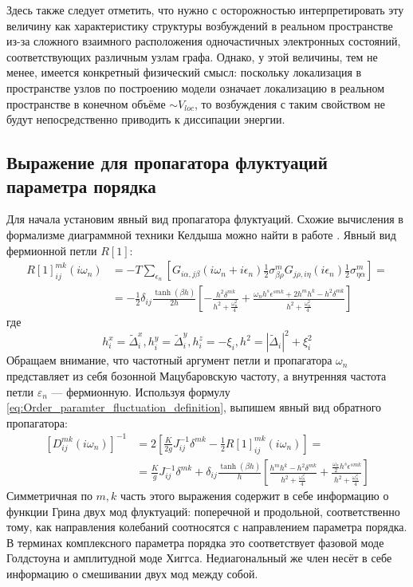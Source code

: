 Здесь также следует отметить, что нужно с осторожностью интерпретировать эту величину как характеристику структуры возбуждений в реальном пространстве из-за сложного взаимного расположения одночастичных электронных состояний, соответствующих различным узлам графа. Однако, у этой величины, тем не менее, имеется конкретный физический смысл: поскольку локализация в пространстве узлов по построению модели означает локализацию в реальном пространстве в конечном объёме $\sim V_{loc}$, то возбуждения с таким свойством не будут непосредственно приводить к диссипации энергии.


\subsection{Выражение для пропагатора флуктуаций параметра порядка}
Для начала установим явный вид пропагатора флуктуаций. Схожие вычисления в формализме диаграммной техники Келдыша можно найти в работе \cite{Poboiko_Feigelman_Paraconductivity}. 
Явный вид фермионной петли $R[1]$:
\begin{equation*}
	\begin{split}
		R[1]_{ij}^{mk}(i\omega_n) & = -T \sum_{\epsilon_n} \left[ G_{i\alpha,j\beta}(i\omega_n + i \epsilon_n) \frac{1}{2}\sigma^m_{\beta\rho} G_{j\rho,i\eta}(i \epsilon_n) \frac{1}{2} \sigma^m_{\eta\alpha} \right] = \\
		& = -\frac{1}{2} \delta_{ij} \frac{\tanh(\beta h)}{2 h} \left[ -\frac{ h^2 \delta^{mk} }{ h^2 + \frac{\omega_n^2}{4} } + \frac{ \omega_n h^s \epsilon^{smk} + 2 h^m h^k - h^2 \delta^{mk} }{h^2 + \frac{\omega_n^2}{4}} \right]
	\end{split}
\end{equation*}
где
$$
h^x_i = \widetilde{\Delta}^x_i, h^y_i = \widetilde{\Delta}^y_i, h^z_i = - \xi_i, h^2 = \left| \widetilde{\Delta}_i \right|^2 + \xi_i^2
$$
Обращаем внимание, что частотный аргумент петли и пропагатора $\omega_n$ представляет из себя бозонной Мацубаровскую частоту, а внутренняя частота петли $\varepsilon_n$ --- фермионную. Используя формулу \eqref{eq:Order_paramter_fluctuation_definition}, выпишем явный вид обратного пропагатора:
\begin{equation}
	\label{eq:Order_parameter_fluctuation_inverse_propagator_explicit}
	\begin{split}
		\left[ D^{mk}_{ij}(i \omega_n) \right]^{-1} & =  2\left[ \frac{K}{2g} J_{ij}^{-1} \delta^{mk} - \frac{1}{2} R[1]_{ij}^{mk}(i\omega_n) \right] = \\
		& = \frac{K}{g} J_{ij}^{-1} \delta^{mk} + \delta_{ij} \frac{\tanh(\beta h)}{h} \left[ \frac{ h^m h^k - h^2 \delta^{mk} }{h^2 + \frac{\omega_n^2}{4}} + \frac{ \frac{\omega_n}{2} h^s \epsilon^{smk} }{h^2 + \frac{\omega_n^2}{4}} \right]
	\end{split}
\end{equation}
Симметричная по $m,k$ часть этого выражения содержит в себе информацию о функции Грина двух мод флуктуаций: поперечной и продольной, соответственно тому, как направления колебаний соотносятся с направлением параметра порядка. В терминах комплексного параметра порядка это соответствует фазовой моде Голдстоуна и амплитудной моде Хиггса. Недиагональный же член несёт в себе информацию о смешивании двух мод между собой.

